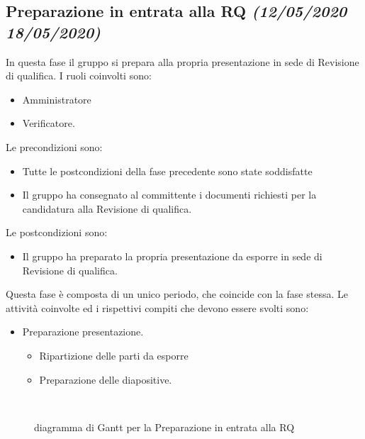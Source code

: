 \documentclass[../piano-di-progetto.tex]{subfiles}
\begin{document}
\subsection[Preparazione in entrata alla RQ]{Preparazione in entrata alla RQ {\normalsize\normalfont\itshape(12/05/2020  18/05/2020)}}%
\label{sub:preparazione_in_entrata_alla_rq}
In questa fase il gruppo si prepara alla propria presentazione in sede di Revisione di qualifica.
I ruoli coinvolti sono:
\begin{itemize}
  \item Amministratore
  \item Verificatore.
\end{itemize}
Le precondizioni sono:
\begin{itemize}
  \item Tutte le postcondizioni della fase precedente sono state soddisfatte
  \item Il gruppo ha consegnato al committente i documenti richiesti per la candidatura alla Revisione di qualifica.
\end{itemize}
Le postcondizioni sono:
\begin{itemize}
  \item Il gruppo ha preparato la propria presentazione da esporre in sede di Revisione di qualifica.
\end{itemize}
Questa fase è composta di un unico periodo, che coincide con la fase stessa.
Le attività coinvolte ed i rispettivi compiti che devono essere svolti sono:
\begin{itemize}
  \item Preparazione presentazione.
  \begin{itemize}
    \item Ripartizione delle parti da esporre
    \item Preparazione delle diapositive.
  \end{itemize}
\end{itemize}
\begin{figure}[H]
  \centering
  
  \caption{diagramma di Gantt per la Preparazione in entrata alla RQ}%
~~\label{fig:gantt_preparazione_rq}
\end{figure}
\end{document}
